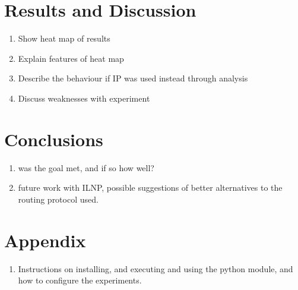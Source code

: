 \documentclass[12pt]{article}
\begin{document}
\section{Results and Discussion}

\begin{enumerate}
\item Show heat map of results
\item Explain features of heat map
\item Describe the behaviour if IP was used instead through analysis
\item Discuss weaknesses with experiment
\end{enumerate}

\section{Conclusions}

\begin{enumerate}	
\item was the goal met, and if so how well?
\item future work with ILNP, possible suggestions of better alternatives to the routing protocol used.
\end{enumerate}

\section{Appendix}
\begin{enumerate}
\item Instructions on installing, and executing and using the python module, and how to configure the experiments.
\end{enumerate}



\end{document}
